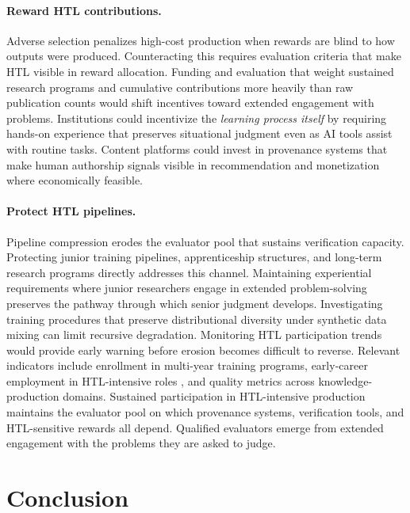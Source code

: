 \documentclass{article}
\theoremstyle{plain}
\theoremstyle{definition}
\theoremstyle{remark}
\begin{document}
\paragraph{Reward HTL contributions.}
Adverse selection penalizes high-cost production when rewards are blind to how outputs were produced. Counteracting this requires evaluation criteria that make HTL visible in reward allocation. Funding and evaluation that weight sustained research programs and cumulative contributions more heavily than raw publication counts would shift incentives toward extended engagement with problems. Institutions could incentivize the \emph{learning process itself} by requiring hands-on experience that preserves situational judgment even as AI tools assist with routine tasks. Content platforms could invest in provenance systems that make human authorship signals visible in recommendation and monetization where economically feasible.

\paragraph{Protect HTL pipelines.}
Pipeline compression erodes the evaluator pool that sustains verification capacity. Protecting junior training pipelines, apprenticeship structures, and long-term research programs directly addresses this channel. Maintaining experiential requirements where junior researchers engage in extended problem-solving preserves the pathway through which senior judgment develops. Investigating training procedures that preserve distributional diversity under synthetic data mixing \citep{shumailov2024curserecursiontraininggenerated, alemohammad2024selfconsuming} can limit recursive degradation. Monitoring HTL participation trends would provide early warning before erosion becomes difficult to reverse. Relevant indicators include enrollment in multi-year training programs, early-career employment in HTL-intensive roles \citep{brynjolfsson2025canaries, signalfire2025talent}, and quality metrics across knowledge-production domains. Sustained participation in HTL-intensive production maintains the evaluator pool on which provenance systems, verification tools, and HTL-sensitive rewards all depend. Qualified evaluators emerge from extended engagement with the problems they are asked to judge.

\section{Conclusion}
\label{sec:conclusion}
\end{document}
